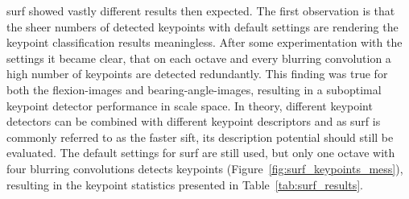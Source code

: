 \acrshort{surf} showed vastly different results then expected.
The first observation is that the sheer numbers of detected keypoints with default settings are rendering the keypoint classification results meaningless.
After some experimentation with the settings it became clear, that on each octave and every blurring convolution a high number of keypoints are detected redundantly.
This finding was true for both the \glspl{flexion-image} and \glspl{bearing-angle-image}, resulting in a suboptimal keypoint detector performance in scale space.
In theory, different keypoint detectors can be combined with different keypoint descriptors and as \acrshort{surf} is commonly referred to as the faster \acrshort{sift}, its description potential should still be evaluated.
The default settings for \acrshort{surf} are still used, but only one octave with four blurring convolutions detects keypoints (Figure~\ref{fig:surf_keypoints_mess}), resulting in the keypoint statistics presented in Table~\ref{tab:surf_results}.
